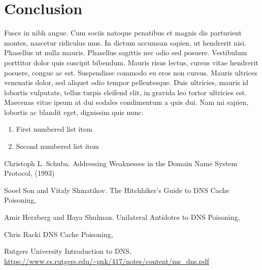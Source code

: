 \documentclass[a4paper, 12pt]{article} %
\begin{document}

\section*{Conclusion}

Fusce in nibh augue. Cum sociis natoque penatibus et magnis dis parturient montes, nascetur ridiculus mus. In dictum accumsan sapien, ut hendrerit nisi. Phasellus ut nulla mauris. Phasellus sagittis nec odio sed posuere. Vestibulum porttitor dolor quis suscipit bibendum. Mauris risus lectus, cursus vitae hendrerit posuere, congue ac est. Suspendisse commodo eu eros non cursus. Mauris ultrices venenatis dolor, sed aliquet odio tempor pellentesque. Duis ultricies, mauris id lobortis vulputate, tellus turpis eleifend elit, in gravida leo tortor ultricies est. Maecenas vitae ipsum at dui sodales condimentum a quis dui. Nam mi sapien, lobortis ac blandit eget, dignissim quis nunc.

\begin{enumerate}
\item First numbered list item
\item Second numbered list item
\end{enumerate}



%
\begin{thebibliography}{99} %

Christoph L. Schuba. 
\newblock Addressing Weaknesses in the Domain Name System Protocol,  
 (1993)

Sooel Son and Vitaly Shmatikov.
\newblock The Hitchhiker's Guide to DNS Cache Poisoning, 

Amir Herzberg and Haya Shulman.
\newblock Unilateral Antidotes to DNS Poisoning, 

Chris Racki
\newblock DNS Cache Poisoning, 

Rutgers University
\newblock Introduction to DNS,
\newblock \url{https://www.cs.rutgers.edu/~pxk/417/notes/content/ms_dns.pdf}
 
\end{thebibliography}

\end{document}
